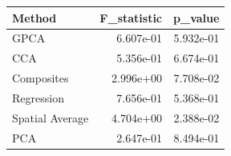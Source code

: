 \begin{tabular}{lrr}
\toprule
Method & F_statistic & p_value \\
\midrule
GPCA & 6.607e-01 & 5.932e-01 \\
CCA & 5.356e-01 & 6.674e-01 \\
Composites & 2.996e+00 & 7.708e-02 \\
Regression & 7.656e-01 & 5.368e-01 \\
Spatial Average & 4.704e+00 & 2.388e-02 \\
PCA & 2.647e-01 & 8.494e-01 \\
\bottomrule
\end{tabular}

